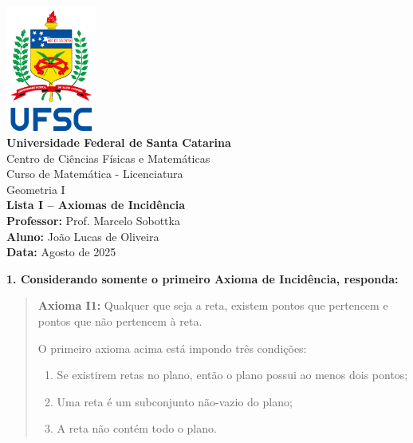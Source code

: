 \documentclass[12pt,a4paper]{article}
\newcommand{\universidade}{Universidade Federal de Santa Catarina}
\newcommand{\centro}{Centro de Ciências Físicas e Matemáticas}
\newcommand{\curso}{Curso de Matemática - Licenciatura}
\newcommand{\disciplina}{Geometria I}
\newcommand{\professor}{Prof. Marcelo Sobottka}
\newcommand{\autor}{João Lucas de Oliveira}
\newcommand{\dataentrega}{Agosto de 2025}
\begin{document}
\begin{center}
    \includegraphics[width=3cm]{ufsc_logo}\\[0.3cm]
    \textbf{\universidade}\\
    \centro\\
    \curso\\[1cm]
    \disciplina\\
    \textbf{Lista I – Axiomas de Incidência}\\[0.5cm]
    \textbf{Professor:} \professor \\
    \textbf{Aluno:} \autor \\
    \textbf{Data:} \dataentrega
\end{center}

\vspace{1cm}
\onehalfspacing

\textbf{1. Considerando somente o primeiro Axioma de Incidência, responda:}

\vspace{0.4cm}

\begin{quote}
\textbf{Axioma I1:} Qualquer que seja a reta, existem pontos que pertencem e pontos que não pertencem à reta.

O primeiro axioma acima está impondo três condições:
\begin{enumerate}[label=(\roman*)]
    \item Se existirem retas no plano, então o plano possui ao menos dois pontos;
    \item Uma reta é um subconjunto não-vazio do plano;
    \item A reta não contém todo o plano.
\end{enumerate}
\end{quote}

\vspace{0.4cm}
\end{document}
